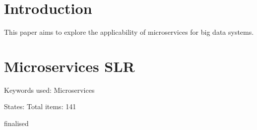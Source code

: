 \documentclass[conference]{IEEEtran}
\begin{document}
\title{}

\author{
    \and
}

\maketitle

\begin{abstract}

\end{abstract}


\begin{IEEEkeywords}

\end{IEEEkeywords}

\section{Introduction}

This paper aims to explore the applicability of microservices for big data systems.


\section{Microservices SLR}

Keywords used:
Microservices

States:
Total items: 141

finalised




% 
% 
\end{document}
